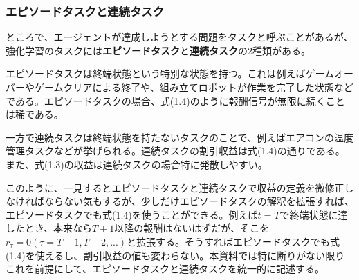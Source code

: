 \documentclass[dvipdfmx, 9pt, a4paper]{jsarticle}
\numberwithin{equation}{section}
\begin{document}
\subsubsection{エピソードタスクと連続タスク}
ところで、エージェントが達成しようとする問題をタスクと呼ぶことがあるが、強化学習のタスクには{\bf エピソードタスク}と{\bf 連続タスク}の2種類がある。\par
エピソードタスクは終端状態という特別な状態を持つ。これは例えばゲームオーバーやゲームクリアによる終了や、組み立てロボットが作業を完了した状態などである。エピソードタスクの場合、式(1.4)のように報酬信号が無限に続くことは稀である。\par
一方で連続タスクは終端状態を持たないタスクのことで、例えばエアコンの温度管理タスクなどが挙げられる。連続タスクの割引収益は式(1.4)の通りである。また、式(1.3)の収益は連続タスクの場合特に発散しやすい。\par
このように、一見するとエピソードタスクと連続タスクで収益の定義を微修正しなければならない気もするが、少しだけエピソードタスクの解釈を拡張すれば、エピソードタスクでも式(1.4)を使うことができる。例えば$t=T$で終端状態に達したとき、本来なら$T+1$以降の報酬はないはずだが、そこを$r_\tau=0(\tau=T+1, T+2, ...)$と拡張する。そうすればエピソードタスクでも式(1.4)を使えるし、割引収益の値も変わらない。本資料では特に断りがない限りこれを前提にして、エピソードタスクと連続タスクを統一的に記述する。
\end{document}
